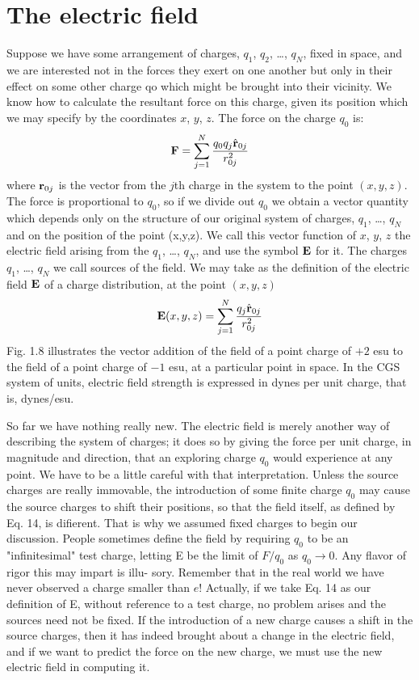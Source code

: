 \section{The electric field}

Suppose we have some arrangement of charges, $q_1$, $q_2$, \ldots , $q_N$,
fixed in space, and we are interested not in the forces they exert on
one another but only in their effect on some other charge qo which
might be brought into their vicinity. We know how to calculate the
resultant force on this charge, given its position which we may specify
by the coordinates $x$, $y$, $z$. The force on the charge $q_0$ is:
\begin{equation}
  \mathbf{F} = \sum_{j=1}^N \frac{q_0q_j\hat{\mathbf{r}}_{0j}}{r_{0j}^2}
\end{equation}
where $\mathbf{r}_{0j}$ is the vector from the $j$th charge in the system to the point
$(x,y,z)$. The force is proportional to $q_0$, so if we divide out $q_0$ we
obtain a vector quantity which depends only on the structure of our
original system of charges, $q_1$, \ldots , $q_N$ and on the position of the point
(x,y,z). We call this vector function of $x$, $y$, $z$ the electric field arising
from the $q_1$, \ldots , $q_N$, and use the symbol $\mathbf{E}$ for it. The charges
$q_1$, \ldots , $q_N$ we call sources of the field. We may take as the definition
of the electric field $\mathbf{E}$ of a charge distribution, at the point $(x,y,z)$
\begin{equation}
  \mathbf{E}(x,y,z) = \sum_{j=1}^N \frac{q_j\hat{\mathbf{r}}_{0j}}{r_{0j}^2}
\end{equation}
Fig. 1.8 illustrates the vector addition of the field of a point charge
of $+2$ esu to the field of a point charge of $-1$ esu, at a particular
point in space. In the CGS system of units, electric field strength is
expressed in dynes per unit charge, that is, dynes/esu.

So far we have nothing really new. The electric field is merely
another way of describing the system of charges; it does so by giving
the force per unit charge, in magnitude and direction, that an exploring
charge $q_0$ would experience at any point. We have to be a
little careful with that interpretation. Unless the source charges are
really immovable, the introduction of some finite charge $q_0$ may
cause the source charges to shift their positions, so that the field itself,
as defined by Eq. 14, is difierent. That is why we assumed fixed
charges to begin our discussion. People sometimes define the field
by requiring $q_0$ to be an "infinitesimal" test charge, letting E be the
limit of $F/q_0$ as $q_0\rightarrow0$. Any flavor of rigor this may impart is illu-
sory. Remember that in the real world we have never observed a
charge smaller than $e$! Actually, if we take Eq. 14 as our definition
of E, without reference to a test charge, no problem arises and the
sources need not be fixed. If the introduction of a new charge
causes a shift in the source charges, then it has indeed brought about
a change in the electric field, and if we want to predict the force on
the new charge, we must use the new electric field in computing it.

